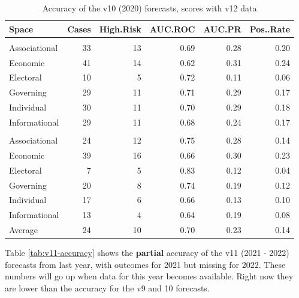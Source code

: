 \documentclass[
  11pt,
]{article}
\begin{document}
\begin{table}

\caption{\label{tab:v10-accuracy}Accuracy of the v10 (2020) forecasts, scores with v12 data}
\centering
\begin{tabular}[t]{lrrrrr}
\toprule
Space & Cases & High.Risk & AUC.ROC & AUC.PR & Pos..Rate\\
\midrule
\addlinespace[0.3em]
\multicolumn{6}{l}{\textbf{Closing}}\\
\hspace{1em}Associational & 33 & 13 & 0.69 & 0.28 & 0.20\\
\hspace{1em}Economic & 41 & 14 & 0.62 & 0.31 & 0.24\\
\hspace{1em}Electoral & 10 & 5 & 0.72 & 0.11 & 0.06\\
\hspace{1em}Governing & 29 & 11 & 0.71 & 0.29 & 0.17\\
\hspace{1em}Individual & 30 & 11 & 0.70 & 0.29 & 0.18\\
\hspace{1em}Informational & 29 & 11 & 0.68 & 0.24 & 0.17\\
\addlinespace[0.3em]
\multicolumn{6}{l}{\textbf{Opening}}\\
\hspace{1em}Associational & 24 & 12 & 0.75 & 0.28 & 0.14\\
\hspace{1em}Economic & 39 & 16 & 0.66 & 0.30 & 0.23\\
\hspace{1em}Electoral & 7 & 5 & 0.83 & 0.12 & 0.04\\
\hspace{1em}Governing & 20 & 8 & 0.74 & 0.19 & 0.12\\
\hspace{1em}Individual & 17 & 6 & 0.66 & 0.13 & 0.10\\
\hspace{1em}Informational & 13 & 4 & 0.64 & 0.19 & 0.08\\
Average & 24 & 10 & 0.70 & 0.23 & 0.14\\
\bottomrule
\end{tabular}
\end{table}

Table \ref{tab:v11-accuracy} shows the \textbf{partial} accuracy of the
v11 (2021 - 2022) forecasts from last year, with outcomes for 2021 but
missing for 2022. These numbers will go up when data for this year
becomes available. Right now they are lower than the accuracy for the v9
and 10 forecasts.
\end{document}
